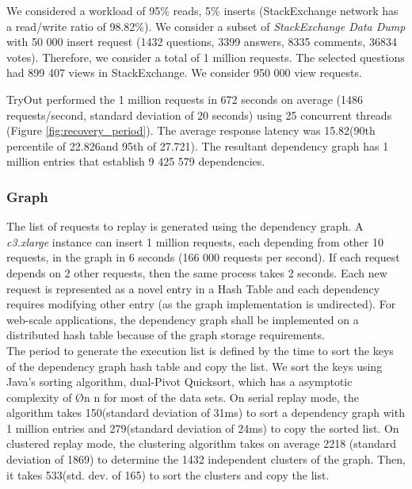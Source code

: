 We considered a workload of 95\% reads, 5\% inserts (StackExchange network has a read/write ratio of 98.82\%). We consider a subset of \textit{StackExchange Data Dump} \cite{stackexchange_data} with 50 000 insert request (1432 questions, 3399 answers, 8335 comments, 36834 votes). Therefore, we consider a total of 1 million requests. The selected questions had 899 407 views in StackExchange. We consider 950 000 view requests. 

TryOut performed the 1 million requests in 672 seconds on average (1486 requests/second, standard deviation of 20 seconds) using 25 concurrent threads (Figure \ref{fig:recovery_period}). The average response latency was 15.82\ms (90th percentile of 22.826\ms and 95th of 27.721\ms). The resultant dependency graph has 1 million entries that establish 9 425 579 dependencies.\\



\subsubsection{Graph}\label{sec:eval:recovery:graph}
The list of requests to replay is generated using the dependency graph. A \emph{c3.xlarge} instance can insert 1 million requests, each depending from other 10 requests, in the graph in 6 seconds (166 000 requests per second). If each request depends on 2 other requests, then the same process takes 2 seconds. Each new request is represented as a novel entry in a Hash Table and each dependency requires modifying other entry (as the graph implementation is undirected). For web-scale applications, the dependency graph shall be implemented on a distributed hash table because of the graph storage requirements.\\


The period to generate the execution list is defined by the time to sort the keys of the dependency graph hash table and copy the list. We sort the keys using Java's sorting algorithm, dual-Pivot Quicksort, which has a asymptotic complexity of \O{n \log{} n} for most of the data sets. On serial replay mode, the algorithm takes 150\ms (standard deviation of 31ms) to sort a dependency graph with 1 million entries and 279\ms (standard deviation of 24ms) to copy the sorted list. On clustered replay mode, the clustering algorithm takes on average 2218 \ms (standard deviation of 1869\ms) to determine the 1432 independent clusters of the graph. Then, it takes 533\ms (std. dev. of 165\ms) to sort the clusters and copy the list. %



